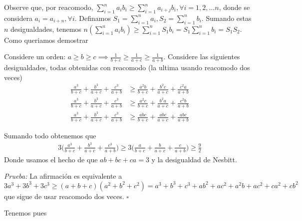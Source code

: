 \begin{sol}
	Observe que, por reacomodo, $\sum_{i=1}^{n} a_{i}b_{i} \geq \sum_{i=1}^{n} a_{i+j}b_{i}, \forall i = 1, 2, \dots n$, donde se considera $a_{i} = a_{i+n}, \forall i$. Definamos $S_{1} = \sum_{i=1}^{n} a_{i}, S_{2} = \sum_{i=1}^{n} b_{i}$. Sumando estas $n$ desigualdades, tenemos
	$n(\sum_{i=1}^{n} a_{i}b_{i}) \geq \sum_{i=1}^{n} S_{1}b_{i} = S_{1}\sum_{i=1}^{n} b_{i} = S_{1}S_{2}$. Como queriamos demostrar
\end{sol}

\begin{sol}
	Considere un orden: $a \geq b \geq c\implies \frac{1}{b+c} \geq \frac{1}{a+c} \geq \frac{1}{a+b} $. Considere las siguientes desigualdades, todas obtenidas con reacomodo (la ultima usando reacomodo dos veces)
	\begin{align}
	\frac{a^3}{b+c}+\frac{b^3}{a+c} + \frac{c^3}{a+b} & \geq \frac{a^2b}{b+c}+\frac{b^2c}{a+c} + \frac{c^2a}{a+b}\\
	\frac{a^3}{b+c}+\frac{b^3}{a+c} + \frac{c^3}{a+b} & \geq \frac{a^2c}{b+c}+\frac{b^2a}{a+c} + \frac{c^2b}{a+b}\\
	\frac{a^3}{b+c}+\frac{b^3}{a+c} + \frac{c^3}{a+b} & \geq \frac{abc}{b+c}+\frac{abc}{a+c} + \frac{abc}{a+b}
	\end{align}
	
	Sumando todo obtenemos que 
	\begin{align}
	3\bigg(\frac{a^3}{b+c}+\frac{b^3}{a+c} + \frac{c^3}{a+b}\bigg) \geq 3 \bigg(\frac{a}{b+c}+\frac{b}{a+c} + \frac{c}{a+b}\bigg) \geq \frac{9}{2}
	\end{align}
	Donde usamos el hecho de que $ab+bc+ca = 3 $ y la desigualdad de Nesbitt.
\end{sol}

\begin{sol}
	\begin{lem}
		
	\end{lem}
	\textit{Prueba:} La afirmaci\'on es equivalente a $3a^3+3b^3+3c^3 \geq (a+b+c)(a^2+b^2+c^2) = a^3+b^3+c^3+ab^2+ac^2+a^2b+ac^2+ca^2+cb^2$ que sigue de usar reacomodo dos veces. $\square$
	
	Tenemos pues 

\end{sol}

